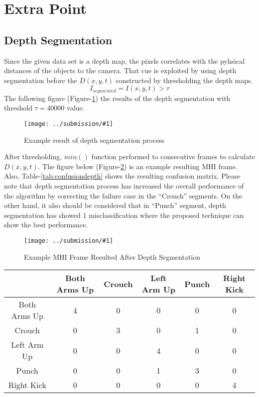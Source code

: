 \documentclass{article}
\newcommand{\listFigure}[3]{ \begin{figure}[H]
\texttt{[image: ../submission/\#1]}
		\caption{#2\label{fig:#3}} 
	\end{figure}		
}
\begin{document}
\section{Extra Point}
\subsection{Depth Segmentation}
Since the given data set is a depth map, the pixels correlates with the
pyhsical distances of the objects to the camera. That cue is exploited by using
depth segmentation before the $D(x,y,t)$ constructed by thresholding the depth
maps. 
$$I_{segmented} = I(x,y,t) > \tau$$
The following figure (Figure-\ref{fig:depthSegmentation}) the results of the
depth segmentation with threshold $\tau=40000$ value.

\listFigure{depthSegmentation.png}{Example result
of depth segmentation process}{depthSegmentation} 

After thresholding, $min()$ function performed to consecutive frames to
calculate $D(x,y,t)$. The figure below (Figure-\ref{fig:MHIDepth}) is an example
resulting MHI frame. Also, Table-\ref{tab:confusiondepth} shows the resulting
confusion matrix. Please note that depth segmentation process has increased the
overall performance of the algorithm by correcting the failure case in
the ``Crouch'' segments. On the other hand, it also should be considered that in
``Punch'' segment, depth segmentation has showed 1 misclassification where the
proposed technique can show the best performance.

\listFigure{MHIDepth}{Example MHI Frame Resulted After Depth
Segmentation}{MHIDepth}

\begin{center}\label{tab:confusiondepth}
	\begin{tabular}{ |c | c | c | c | c | c| }
	\hline
	  & Both Arms Up & Crouch & Left Arm Up & Punch & Right Kick \\ \hline
	  Both Arms Up & 4 & 0 & 0 & 0 & 0 \\ \hline
	  Crouch & 0 & 3 & 0 & 1 & 0 \\ \hline
	  Left Arm Up & 0 & 0 & 4 & 0 & 0 \\ \hline
	  Punch & 0 & 0 & 1 & 3 & 0 \\ \hline
	  Right Kick & 0 & 0 & 0 & 0 & 4 \\
	\hline
	\end{tabular}
\end{center}
\end{document}
